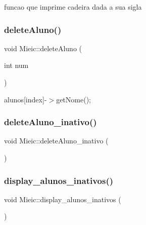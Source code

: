 funcao que imprime cadeira dada a sua sigla \hypertarget{class_mieic_aa5def5f9735af4ea7a92f81e4415eecc}{}\label{class_mieic_aa5def5f9735af4ea7a92f81e4415eecc} 
\subsubsection{\texorpdfstring{delete\+Aluno()}{deleteAluno()}}
{\footnotesize\ttfamily void Mieic\+::delete\+Aluno (\begin{DoxyParamCaption}\item[{int}]{num }\end{DoxyParamCaption})}

alunos\mbox{[}index\mbox{]}-\/$>$get\+Nome(); \hypertarget{class_mieic_a50f58ffae6adb088bb0cc0fddfa18a00}{}\label{class_mieic_a50f58ffae6adb088bb0cc0fddfa18a00} 
\subsubsection{\texorpdfstring{delete\+Aluno\+\_\+inativo()}{deleteAluno\_inativo()}}
{\footnotesize\ttfamily void Mieic\+::delete\+Aluno\+\_\+inativo (\begin{DoxyParamCaption}{ }\end{DoxyParamCaption})}

\hypertarget{class_mieic_ae92698b870074dccf12fd789e772a813}{}\label{class_mieic_ae92698b870074dccf12fd789e772a813} 
\subsubsection{\texorpdfstring{display\+\_\+alunos\+\_\+inativos()}{display\_alunos\_inativos()}}
{\footnotesize\ttfamily void Mieic\+::display\+\_\+alunos\+\_\+inativos (\begin{DoxyParamCaption}{ }\end{DoxyParamCaption})}

\hypertarget{class_mieic_adfcc246f9e983b482e1340778a3b7aec}{}\label{class_mieic_adfcc246f9e983b482e1340778a3b7aec} 
